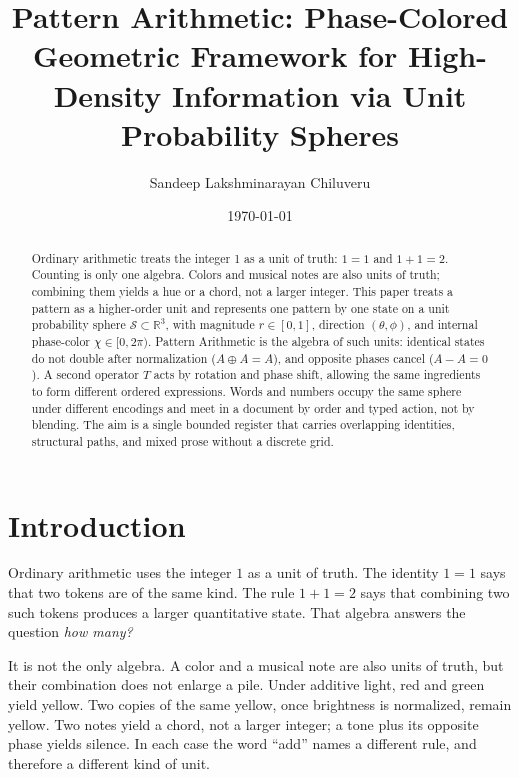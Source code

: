 \documentclass[12pt, a4paper]{article}
\title{Pattern Arithmetic: Phase-Colored Geometric Framework for High-Density Information via Unit Probability Spheres}
\author{Sandeep Lakshminarayan Chiluveru}
\date{\today}
\begin{document}
\maketitle

\begin{abstract}
Ordinary arithmetic treats the integer 1 as a unit of truth: $1=1$ and $1+1=2$. Counting is only one algebra. Colors and musical notes are also units of truth; combining them yields a hue or a chord, not a larger integer. This paper treats a pattern as a higher-order unit and represents one pattern by one state on a unit probability sphere $\mathcal{S} \subset \mathbb{R}^3$, with magnitude $r \in [0, 1]$, direction $(\theta, \phi)$, and internal phase-color $\chi \in [0, 2\pi)$. Pattern Arithmetic is the algebra of such units: identical states do not double after normalization ($A \oplus A = A$), and opposite phases cancel ($A - A = 0$). A second operator $T$ acts by rotation and phase shift, allowing the same ingredients to form different ordered expressions. Words and numbers occupy the same sphere under different encodings and meet in a document by order and typed action, not by blending. The aim is a single bounded register that carries overlapping identities, structural paths, and mixed prose without a discrete grid.
\end{abstract}

\section{Introduction}

Ordinary arithmetic uses the integer $1$ as a unit of truth.
The identity $1=1$ says that two tokens are of the same kind.
The rule $1+1=2$ says that combining two such tokens produces a
larger quantitative state. That algebra answers the question
\emph{how many?}

It is not the only algebra. A color and a musical note are also
units of truth, but their combination does not enlarge a pile.
Under additive light, red and green yield yellow. Two copies of
the same yellow, once brightness is normalized, remain yellow.
Two notes yield a chord, not a larger integer; a tone plus its
opposite phase yields silence. In each case the word ``add''
names a different rule, and therefore a different kind of unit.
\end{document}
